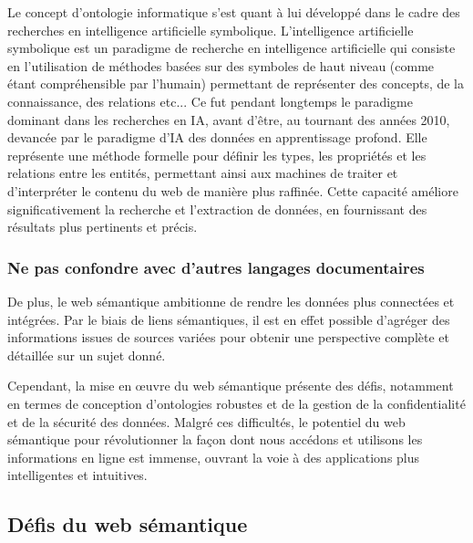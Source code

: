 \documentclass[12pt]{report}
\begin{document}
Le concept d'ontologie informatique s'est quant à lui développé dans le cadre des recherches en intelligence artificielle symbolique. L'intelligence artificielle symbolique est un paradigme de recherche en intelligence artificielle qui consiste en l'utilisation de méthodes basées sur des symboles de haut niveau (comme étant compréhensible par l'humain) permettant de représenter des concepts, de la connaissance, des relations etc... Ce fut pendant longtemps le paradigme dominant dans les recherches en IA, avant d'être, au tournant des années 2010, devancée par le paradigme d'IA des données en apprentissage profond\autocite{GarneloShanahan2019}.
Elle représente une méthode formelle pour définir les types, les propriétés et les relations entre les entités, permettant ainsi aux machines de traiter et d'interpréter le contenu du web de manière plus raffinée. Cette capacité améliore significativement la recherche et l'extraction de données, en fournissant des résultats plus pertinents et précis.
\subsubsection{Ne pas confondre avec d'autres langages documentaires}
De plus, le web sémantique ambitionne de rendre les données plus connectées et intégrées. Par le biais de liens sémantiques, il est en effet possible d'agréger des informations issues de sources variées pour obtenir une perspective complète et détaillée sur un sujet donné.

Cependant, la mise en œuvre du web sémantique présente des défis, notamment en termes de conception d'ontologies robustes et de la gestion de la confidentialité et de la sécurité des données. Malgré ces difficultés, le potentiel du web sémantique pour révolutionner la façon dont nous accédons et utilisons les informations en ligne est immense, ouvrant la voie à des applications plus intelligentes et intuitives.
\subsection{Défis du web sémantique}
\newpage
\end{document}

